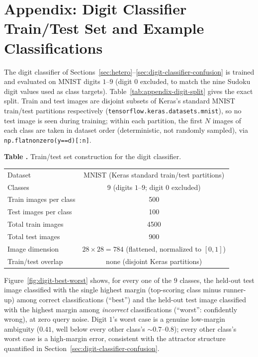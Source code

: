 \documentclass[11pt]{article}
\newcommand{\toprule}{\hline\hline}
\newcommand{\bottomrule}{\hline\hline}
\begin{document}
\section*{Appendix: Digit Classifier Train/Test Set and Example Classifications}
\label{sec:appendix-digit-classifier}

The digit classifier of Sections~\ref{sec:hetero}--\ref{sec:digit-classifier-confusion} is
trained and evaluated on MNIST digits $1$--$9$ (digit $0$ excluded, to match the nine Sudoku
digit values used as class targets). Table~\ref{tab:appendix-digit-split} gives the exact
split. Train and test images are disjoint subsets of Keras's standard MNIST train/test
partitions respectively (\texttt{tensorflow.keras.datasets.mnist}), so no test image is seen
during training; within each partition, the first $N$ images of each class are taken in
dataset order (deterministic, not randomly sampled), via
\texttt{np.flatnonzero(y==d)[:n]}.

\label{tab:appendix-digit-split}
\noindent\textbf{Table \thetable.} Train/test set construction for the digit classifier.
\begin{center}
\begin{tabular}{lc}
\toprule
Dataset & MNIST (Keras standard train/test partitions) \\
Classes & 9 (digits $1$--$9$; digit $0$ excluded) \\
Train images per class & 500 \\
Test images per class & 100 \\
Total train images & 4500 \\
Total test images & 900 \\
Image dimension & $28\times28=784$ (flattened, normalized to $[0,1]$) \\
Train/test overlap & none (disjoint Keras partitions) \\
\bottomrule
\end{tabular}
\end{center}

Figure~\ref{fig:digit-best-worst} shows, for every one of the $9$ classes, the held-out test
image classified with the single highest margin (top-scoring class minus runner-up) among
correct classifications (``best'') and the held-out test image classified with the highest
margin among \emph{incorrect} classifications (``worst'': confidently wrong), at zero query
noise. Digit $1$'s worst case is a genuine low-margin ambiguity ($0.41$, well below every other
class's $\sim$0.7--0.8); every other class's worst case is a high-margin error, consistent with
the attractor structure quantified in Section~\ref{sec:digit-classifier-confusion}.
\end{document}
